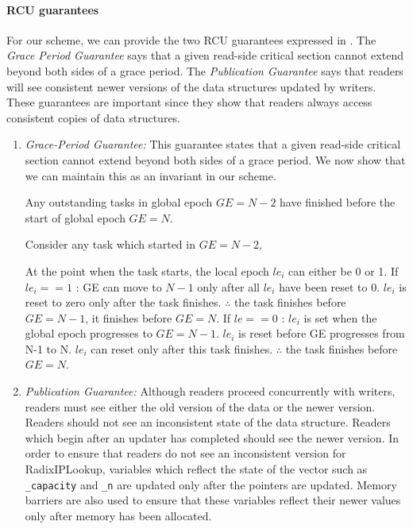 \documentclass[a4paper]{article}
\newcommand{\INDSTATE}[1][1]{\STATE\hspace{#1\algorithmicindent}}
\begin{document}
\paragraph{RCU guarantees} 
For our scheme, we can provide the two RCU guarantees expressed in \cite{urcu}. The \emph{Grace Period Guarantee} says that a given read-side critical section cannot extend beyond both sides of a grace period. The \emph{Publication Guarantee} says that readers will see consistent newer versions of the data structures updated by writers. These guarantees are important since they show that readers always access consistent copies of data structures. 
\begin{enumerate}
\item \emph{Grace-Period Guarantee:} This guarantee states that a given read-side critical section cannot extend beyond both sides of a grace period. We now show that we can maintain this as an invariant in our scheme.

\begin{algorithmic}[float=tph]
\STATE Any outstanding tasks in global epoch $GE=N-2$ have finished before the start of global epoch $GE=N$.

\STATE Consider any task which started in $GE = N-2$,

\STATE At the point when the task starts, the local epoch $le_i$ can either be 0 or 1.
\newline
\STATE If $le_i==1$ :
\INDSTATE GE can move to $N-1$ only after all $le_i$ have been reset to 0. 
\INDSTATE $le_i$ is reset to zero only after the task finishes.
\INDSTATE $\therefore$ the task finishes before $GE=N-1$, it finishes before $GE=N$.
\newline
\STATE If $le==0$ :
\INDSTATE $le_i$ is set when the global epoch progresses to $GE = N-1$.
\INDSTATE $le_i$ is reset before GE progresses from N-1 to N.
\INDSTATE $le_i$ can reset only after this task finishes.
\INDSTATE $\therefore$ the task finishes before $GE=N$.
\end{algorithmic}

\item \emph{Publication Guarantee:} 
Although readers proceed concurrently with writers, readers must see either the old version of the data or the newer version. Readers should not see an inconsistent state of the data structure. Readers which begin after an updater has completed should see the newer version. In order to ensure that readers do not see an inconsistent version for RadixIPLookup, variables which reflect the state of the vector such as \verb+_capacity+ and \verb+_n+ are updated only after the pointers are updated. Memory barriers are also used to ensure that these variables reflect their newer values only after memory has been allocated.\\
\end{enumerate}
\end{document}
